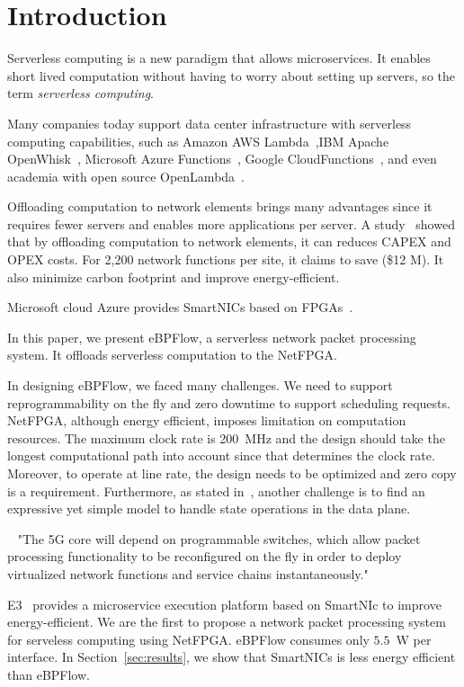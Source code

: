 \section{Introduction}
\label{sec:intro}


Serverless computing is a new paradigm that allows microservices.
It enables short lived computation without having to worry about setting up servers, so the term \textit{serverless computing}.

Many companies today support data center infrastructure with serverless computing capabilities, such as Amazon AWS Lambda~\cite{AWSLambda2017},IBM Apache OpenWhisk~\cite{ApacheOpenWhisk}, Microsoft Azure Functions~\cite{AzureFunctions}, Google CloudFunctions~\cite{GoogleCloudFunctions}, and even academia with open source OpenLambda~\cite{OpenLambda2016}.


Offloading computation to network elements brings many advantages since it requires fewer servers and enables more applications per server. A study~\cite{powersmartnics} showed that by offloading computation to network elements, it can reduces CAPEX and OPEX costs. For 2,200 network functions per site, it claims to save (\$12 M). It also minimize carbon footprint and improve energy-efficient.

Microsoft cloud Azure provides SmartNICs based on FPGAs~\cite{AzureFPGA2018}.

In this paper, we present eBPFlow, a serverless network packet processing system. It offloads serverless computation to the NetFPGA.


In designing eBPFlow, we faced many challenges.
We need to support reprogrammability on the fly and zero downtime to support scheduling requests.
NetFPGA, although energy efficient, imposes limitation on computation resources. The maximum clock rate is 200~MHz and the design should take the longest computational path into account since that determines the clock rate. 
Moreover, to operate at line rate, the design needs to be optimized and zero copy is a requirement.
Furthermore, as stated in~\cite{bifulco2018survey}, another challenge is to find an expressive yet simple model to handle state operations in the data plane.

~\cite{Levai2018}
"The 5G core will depend on programmable switches, which allow packet processing functionality to be reconfigured on the fly in order to deploy virtualized network functions and service chains instantaneously."



E3~\cite{liu2019e3} provides a microservice execution platform based on SmartNIc to improve energy-efficient. We are the first to propose a network packet processing system for serveless computing using NetFPGA. eBPFlow consumes only $5.5$~W per interface. In Section~\ref{sec:results}, we show that SmartNICs is less energy efficient than eBPFlow.

